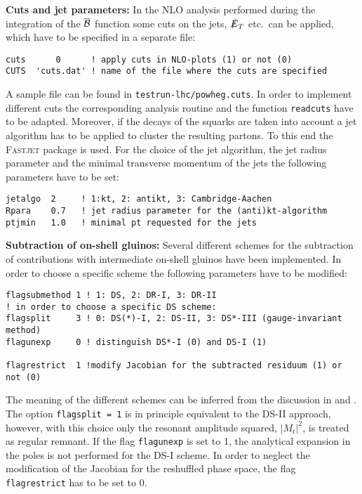 \documentclass[a4paper,11pt]{article}
\begin{document}
\item \textbf{Cuts and jet parameters:} In the NLO analysis performed during the integration of the $\overline{\cal B}$ function some cuts on the jets, $\slashed{E}_T$ etc.~can be applied, which have to be specified in a separate file: 
\begin{verbatim}
cuts      0      ! apply cuts in NLO-plots (1) or not (0)
CUTS  'cuts.dat' ! name of the file where the cuts are specified
\end{verbatim}
A sample file can be found in {\tt testrun-lhc/powheg.cuts}. In order to implement different cuts the corresponding analysis routine and the function {\tt readcuts} have to be adapted. 
Moreover, if the decays of the squarks are taken into account a jet algorithm has to be applied to cluster the resulting partons. To this end the \textsc{Fastjet} package is used. For the choice of the jet algorithm, the jet radius parameter and the minimal transverse momentum of the jets the following parameters have to be set:
\begin{verbatim}
jetalgo  2     ! 1:kt, 2: antikt, 3: Cambridge-Aachen
Rpara    0.7   ! jet radius parameter for the (anti)kt-algorithm
ptjmin   1.0   ! minimal pt requested for the jets
\end{verbatim}
\item \textbf{Subtraction of on-shell gluinos:} Several different schemes for the subtraction of contributions with intermediate on-shell gluinos have been implemented. In order to choose a specific scheme the following parameters have to be modified:
\begin{verbatim}
flagsubmethod 1 ! 1: DS, 2: DR-I, 3: DR-II
! in order to choose a specific DS scheme:
flagsplit     3 ! 0: DS(*)-I, 2: DS-II, 3: DS*-III (gauge-invariant method)
flagunexp     0 ! distinguish DS*-I (0) and DS-I (1)

flagrestrict  1 !modify Jacobian for the subtracted residuum (1) or not (0)
\end{verbatim}
The meaning of the different schemes can be inferred from the discussion in \cite{ownpaper} and \cite{owndiss}. The option {\tt flagsplit = 1} is in principle equivalent to the DS-II approach, however, with this choice only the resonant amplitude squared, $|M_{\text{r}}|^2$, is treated as regular remnant. If the flag {\tt flagunexp} is set to 1, the analytical expansion in the poles is not performed for the DS-I scheme. In order to neglect the modification of the Jacobian for the reshuffled phase space, the flag {\tt flagrestrict} has to be set to 0.
\end{document}

